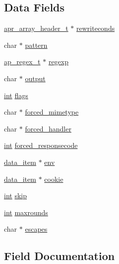 \subsection*{Data Fields}
\begin{DoxyCompactItemize}
\item 
\hyperlink{structapr__array__header__t}{apr\+\_\+array\+\_\+header\+\_\+t} $\ast$ \hyperlink{structrewriterule__entry_ae7b990eebac0e60bb10713c4fed86682}{rewriteconds}
\item 
char $\ast$ \hyperlink{structrewriterule__entry_a94d40aca00255f3f1355212c4a01b6f8}{pattern}
\item 
\hyperlink{structap__regex__t}{ap\+\_\+regex\+\_\+t} $\ast$ \hyperlink{structrewriterule__entry_a5c57f5015a78ac9dd4eccf1ca14be1ab}{regexp}
\item 
char $\ast$ \hyperlink{structrewriterule__entry_a2a620a08afb05a608739630c3afdf34f}{output}
\item 
\hyperlink{pcre_8txt_a42dfa4ff673c82d8efe7144098fbc198}{int} \hyperlink{structrewriterule__entry_a8a45d7e9596dc154db453ef6f03a88ab}{flags}
\item 
char $\ast$ \hyperlink{structrewriterule__entry_a1cc89ed1f465e25518548669280f174e}{forced\+\_\+mimetype}
\item 
char $\ast$ \hyperlink{structrewriterule__entry_a2c374dfe8a328020a44251c9a765b7bd}{forced\+\_\+handler}
\item 
\hyperlink{pcre_8txt_a42dfa4ff673c82d8efe7144098fbc198}{int} \hyperlink{structrewriterule__entry_a524b13a3139ff632436c2ea449a15047}{forced\+\_\+responsecode}
\item 
\hyperlink{structdata__item}{data\+\_\+item} $\ast$ \hyperlink{structrewriterule__entry_a572162865e69759022e95b184254df19}{env}
\item 
\hyperlink{structdata__item}{data\+\_\+item} $\ast$ \hyperlink{structrewriterule__entry_af138d3a97d58018df8eb3e338223c094}{cookie}
\item 
\hyperlink{pcre_8txt_a42dfa4ff673c82d8efe7144098fbc198}{int} \hyperlink{structrewriterule__entry_a699b7289aa9e10b8874b6536ae3dd242}{skip}
\item 
\hyperlink{pcre_8txt_a42dfa4ff673c82d8efe7144098fbc198}{int} \hyperlink{structrewriterule__entry_a85d37c40d4dfb1b64c18cee1a584cc57}{maxrounds}
\item 
char $\ast$ \hyperlink{structrewriterule__entry_a15cba5ba5bb24bd1e8de93e5e7954105}{escapes}
\end{DoxyCompactItemize}


\subsection{Field Documentation}
